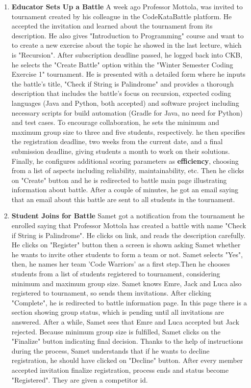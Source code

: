 \begin{enumerate}
    \item \textbf{Educator Sets Up a Battle} \newline A week ago Professor Mottola, was invited to tournament created by his colleague in the CodeKataBattle platform. He accepted the invitation and learned about the tournament from its description. He also gives "Introduction to Programming" course and want to to create a new exercise about the topic he showed in the last lecture, which is "Recursion". After subscription deadline passed, he logged back into CKB, he selects the "Create Battle" option within the "Winter Semester Coding Exercise 1" tournament. He is presented with a detailed form where he inputs the battle's title, "Check if String is Palindrome" and provides a thorough description that includes the battle's focus on recursion, expected coding languages (Java and Python, both accepted) and software project including necessary scripts for build automation (Gradle for Java, no need for Python) and test cases. To encourage collaboration, he sets the minimum and maximum group size to three and five students, respectively. he then specifies the registration deadline, two weeks from the current date, and a final submission deadline, giving students a month to work on their solutions. Finally, he configures additional scoring parameters as \textbf{efficiency}, choosing from a list of aspects including reliability, maintainability, etc. Then he clicks on "Create" button and he is redirected to battle main page illustrating information about battle. After a couple of minutes, he got an email saying that an email about this battle are sent to all students in the tournament.\newline \newline
    \item \textbf{Student Joins for Battle} \newline Samet got a notification from the tournament he enrolled saying that Professor Mottola has created a battle with name "Check if String is Palindrome". He clicks on link, and reads the description carefully. He clicks on "Register" button then a screen is shown asking Samet whether he wants to invite other students to form a team or not. Samet selects "Yes", then, he names her team 'Code Warriors' as a first step.Then he chooses students from a list of students registered to tournament, considering minimum and maximum group size. Samet knows Emre, Jack and Luca also registered to tournament, so sends them invitations. After clicking "Complete", he is redirected to battle information page. In this page there is a section showing group status, which is pending until all invitations are answered. After a while, Samet sees that Emre and Luca accepted but Jack rejected. Because minimum group size is fulfilled, Samet clicks on the "Finalize" button indicating final decision. Thanks to the help of instructions during the process, Samet understands that if he wants to decline registration, he should have clicked on "Decline" button. After every member accepted invitation finalize registration, process ends and status become "Registered". They are given a competitor id.

\end{enumerate}
